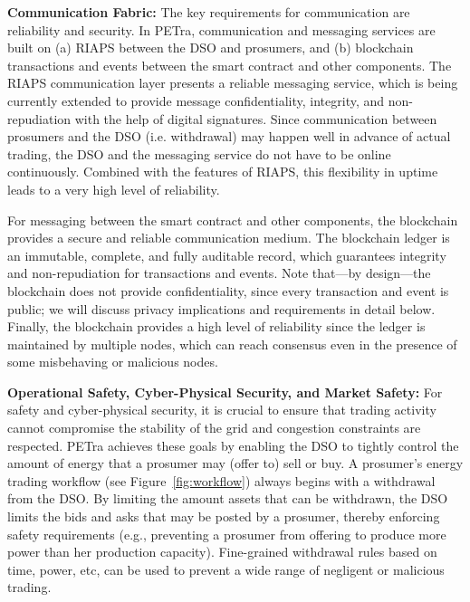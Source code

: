 \textbf{Communication Fabric:}
The key requirements for communication are reliability and security. 
In PETra, communication and messaging services are built on (a) RIAPS between the DSO and prosumers, and (b) blockchain transactions and events between the smart contract and other components.
The RIAPS communication layer \cite{eisele2017riaps} presents a reliable messaging service, which  is being currently extended to provide message confidentiality, integrity, and non-repudiation with the help of digital signatures.
Since communication between prosumers and the DSO (i.e. withdrawal) may happen well in advance of actual trading, the DSO and the messaging service do not have to be online continuously.
Combined with the features of RIAPS, this flexibility in uptime leads to a very high level of reliability. 

For messaging between the smart contract and other components, the blockchain provides a secure and reliable communication medium.
The  blockchain ledger is an immutable, complete, and fully auditable record, which guarantees integrity and non-repudiation for transactions and events.
Note that---by design---the blockchain does not provide confidentiality, since every transaction and event is public; we will discuss privacy implications and requirements in detail below.
Finally, the blockchain provides a high level of reliability since the ledger is maintained by multiple nodes, which can reach consensus even in the presence of some misbehaving or malicious nodes.

\textbf{Operational Safety, Cyber-Physical Security, and Market Safety:}
For safety and cyber-physical security, it is crucial to ensure that  trading activity cannot compromise the stability of the grid and congestion constraints are respected.
PETra achieves these goals by enabling the DSO to tightly control the amount of energy that a prosumer may (offer to) sell or buy.
A prosumer's energy trading workflow (see Figure~\ref{fig:workflow}) always begins with a withdrawal from the DSO.
By limiting the amount assets that can be withdrawn, the DSO limits the bids and asks that may be posted by a prosumer, thereby enforcing safety requirements (e.g., preventing a prosumer from offering to produce more power than her production capacity).
Fine-grained withdrawal rules based on time, power, etc, can be used to prevent a wide range of negligent or malicious trading.


